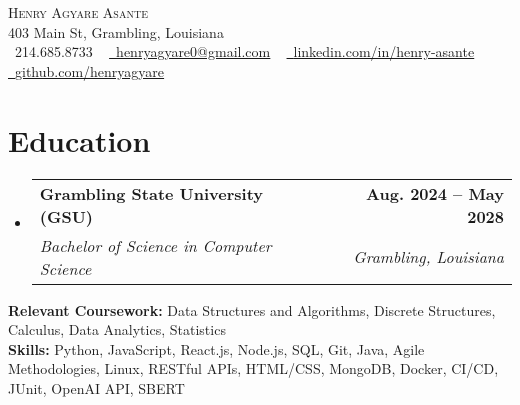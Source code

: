 \documentclass[letterpaper,11pt]{article}
\makeatletter
\newcommand{\resumeSubheading}[4]{
  \vspace{-2pt}\item
    \begin{tabular*}{1.0\textwidth}[t]{l@{\extracolsep{\fill}}r}
      \textbf{#1} & \textbf{\small #2} \\
      \textit{\small#3} & \textit{\small #4} \\
    \end{tabular*}\vspace{-7pt}
}
\newcommand{\resumeSubHeadingListStart}{\begin{itemize}[leftmargin=0.0in, label={}]}
\newcommand{\resumeSubHeadingListEnd}{\end{itemize}}
\makeatother
\begin{document}

\begin{center}
    {\Huge \scshape Henry Agyare Asante} \\ \vspace{1pt}
    403 Main St, Grambling, Louisiana \\ \vspace{1pt}
    \small \raisebox{-0.1\height}\faPhone\ 214.685.8733 ~ \href{mailto:henryagyare0@gmail.com}{\raisebox{-0.2\height}\faEnvelope\  \underline{henryagyare0@gmail.com}} ~ 
    \href{https://www.linkedin.com/in/henry-asante/}{\raisebox{-0.2\height}\faLinkedin\ \underline{linkedin.com/in/henry-asante}}  ~
    \href{https://github.com/henryagyare}{\raisebox{-0.2\height}\faGithub\ \underline{github.com/henryagyare}}
    \vspace{-8pt}
\end{center}


\section{Education}
  \resumeSubHeadingListStart
    \resumeSubheading
      {Grambling State University (GSU)}{Aug. 2024 -- May 2028}
      {Bachelor of Science in Computer Science}{Grambling, Louisiana}
  \resumeSubHeadingListEnd

\textbf{Relevant Coursework:} Data Structures and Algorithms, Discrete Structures, Calculus, Data Analytics, Statistics \\
\vspace{2pt}
\textbf{Skills:} Python, JavaScript, React.js, Node.js, SQL, Git, Java, Agile Methodologies, Linux, RESTful APIs, HTML/CSS, MongoDB, Docker, CI/CD, JUnit, OpenAI API, SBERT
\vspace{-10pt}
\end{document}
